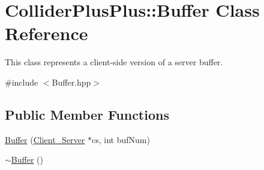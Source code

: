 \hypertarget{classColliderPlusPlus_1_1Buffer}{\section{Collider\-Plus\-Plus\-:\-:Buffer Class Reference}
\label{classColliderPlusPlus_1_1Buffer}
}


This class represents a client-\/side version of a server buffer.  




{\ttfamily \#include $<$Buffer.\-hpp$>$}

\subsection*{Public Member Functions}
\begin{DoxyCompactItemize}
\item 
\hyperlink{classColliderPlusPlus_1_1Buffer_a253743cd16ea0a2579575dd9472a967d}{Buffer} (\hyperlink{classColliderPlusPlus_1_1Client__Server}{Client\-\_\-\-Server} $\ast$cs, int buf\-Num)
\item 
\hypertarget{classColliderPlusPlus_1_1Buffer_a62178f1cb35c5654c0b16d78526de7e8}{\hyperlink{classColliderPlusPlus_1_1Buffer_a62178f1cb35c5654c0b16d78526de7e8}{$\sim$\-Buffer} ()}\label{classColliderPlusPlus_1_1Buffer_a62178f1cb35c5654c0b16d78526de7e8}


\end{DoxyCompactItemize}

